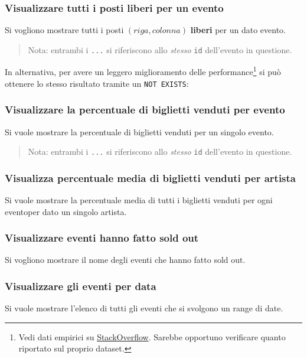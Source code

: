 \documentclass[a4paper,11pt]{article}
\begin{document}
\subsubsection{Visualizzare tutti i posti liberi per un evento}
Si vogliono mostrare tutti i posti $(riga, colonna)$ \textbf{liberi} per un dato evento.


\begin{quote}
  Nota: entrambi i \texttt{...} si riferiscono allo \emph{stesso} \texttt{id}
  dell'evento in questione.
\end{quote}

In alternativa, per avere un leggero miglioramento delle performance\footnote{
Vedi dati empirici su \href{https://stackoverflow.com/a/66785790}{StackOverflow}.
Sarebbe opportuno verificare quanto riportato sul proprio dataset.} si pu\`o
ottenere lo stesso risultato tramite un \texttt{NOT EXISTS}:


\subsubsection{Visualizzare la percentuale di biglietti venduti per evento}
Si vuole mostrare la percentuale di biglietti venduti per un singolo evento.


\begin{quote}
  Nota: entrambi i \texttt{...} si riferiscono allo \emph{stesso} \texttt{id}
  dell'evento in questione.
\end{quote}

\subsubsection{Visualizza percentuale media di biglietti venduti per artista}
Si vuole mostrare la percentuale media di tutti i biglietti venduti per ogni
eventoper dato un singolo artista.


\subsubsection{Visualizzare eventi hanno fatto sold out}
Si vogliono mostrare il nome degli eventi che hanno fatto sold out.

 
\subsubsection{Visualizzare gli eventi per data}
Si vuole mostrare l'elenco di tutti gli eventi che si svolgono un range di date.

\end{document}
